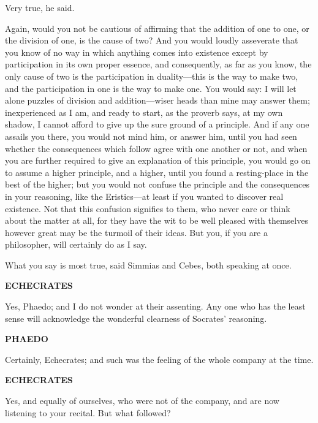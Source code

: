 \documentclass[11pt,letter]{article}
\begin{document}
\par  Very true, he said.

\par  Again, would you not be cautious of affirming that the addition of one to one, or the division of one, is the cause of two? And you would loudly asseverate that you know of no way in which anything comes into existence except by participation in its own proper essence, and consequently, as far as you know, the only cause of two is the participation in duality—this is the way to make two, and the participation in one is the way to make one. You would say: I will let alone puzzles of division and addition—wiser heads than mine may answer them; inexperienced as I am, and ready to start, as the proverb says, at my own shadow, I cannot afford to give up the sure ground of a principle. And if any one assails you there, you would not mind him, or answer him, until you had seen whether the consequences which follow agree with one another or not, and when you are further required to give an explanation of this principle, you would go on to assume a higher principle, and a higher, until you found a resting-place in the best of the higher; but you would not confuse the principle and the consequences in your reasoning, like the Eristics—at least if you wanted to discover real existence. Not that this confusion signifies to them, who never care or think about the matter at all, for they have the wit to be well pleased with themselves however great may be the turmoil of their ideas. But you, if you are a philosopher, will certainly do as I say.

\par  What you say is most true, said Simmias and Cebes, both speaking at once.

\par \textbf{ECHECRATES}
\par   Yes, Phaedo; and I do not wonder at their assenting. Any one who has the least sense will acknowledge the wonderful clearness of Socrates' reasoning.

\par \textbf{PHAEDO}
\par   Certainly, Echecrates; and such was the feeling of the whole company at the time.

\par \textbf{ECHECRATES}
\par   Yes, and equally of ourselves, who were not of the company, and are now listening to your recital. But what followed?
\end{document}
